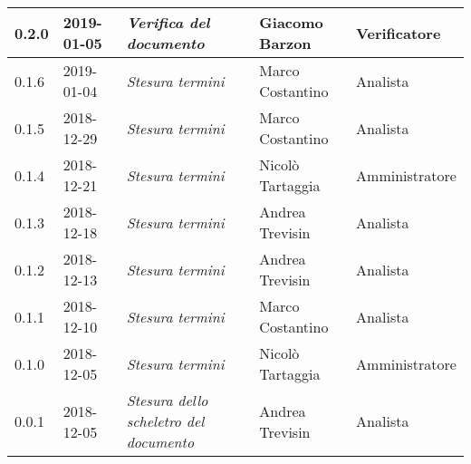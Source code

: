 \begin{longtable}{C{2cm}|C{2.5cm}|C{4.5cm}|C{2.5cm}|C{3cm}}
		0.2.0 & 2019-01-05 & \emph{Verifica del documento} & Giacomo Barzon & Verificatore \\
		\hline
		
		0.1.6 & 2019-01-04 & \emph{Stesura termini} & Marco Costantino & Analista \\
		\hline
		
		0.1.5 & 2018-12-29 & \emph{Stesura termini} & Marco Costantino & Analista \\
		\hline
		
		0.1.4 & 2018-12-21 & \emph{Stesura termini} & Nicolò Tartaggia & Amministratore \\
		\hline
		
		0.1.3 & 2018-12-18 & \emph{Stesura termini} & Andrea Trevisin & Analista \\
		\hline
		
		0.1.2 & 2018-12-13 & \emph{Stesura termini} & Andrea Trevisin & Analista \\
		\hline
		
		0.1.1 & 2018-12-10 & \emph{Stesura termini} & Marco Costantino & Analista \\
		\hline
		
		0.1.0 & 2018-12-05 & \emph{Stesura termini} & Nicolò Tartaggia & Amministratore \\
		\hline
		
		0.0.1 & 2018-12-05 & \emph{Stesura dello scheletro del documento} & Andrea Trevisin & Analista \\
		
	\end{longtable}


\clearpage